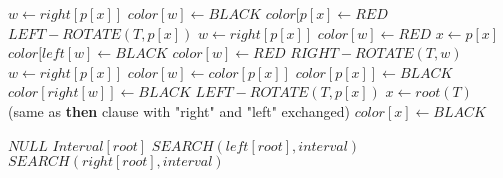\documentclass[11pt]{article}
\begin{document}
\addtocounter{algorithm}{-1}
\begin{algorithm}[h]
\begin{algorithmic}[1]
\EndProcedure
{}
\State $w \gets right[p[x]]$
\State $color[w] \gets BLACK$
\State $color[p[x] \gets RED$
\State $LEFT-ROTATE(T,p[x])$
\State $w \gets right[p[x]]$
\EndIf
{}
\State $color[w] \gets RED$
\State $ x \gets p[x]$
\State $color[left[w] \gets BLACK$
\State $color[w] \gets RED$
\State $ RIGHT-ROTATE(T,w)$
\State $w \gets right[p[x]]$
\Else
\State $color[w] \gets color[p[x]]$
\State $color[p[x]] \gets BLACK$
\State $color[right[w]] \gets BLACK$
\State $LEFT-ROTATE(T,p[x])$
\State $x \gets root(T)$
\EndIf
\Else
\State (same as \textbf{then} clause with "right" and "left" exchanged)
\EndIf
\EndWhile
\State $color[x] \gets BLACK$
\EndProcedure
\\
\end{algorithmic}
\end{algorithm}
\addtocounter{algorithm}{-1}
\begin{algorithm}[h]
\begin{algorithmic}[1]
 
\Return $NULL$
\EndIf
{} 
\Return $Interval[root]$
\EndIf
{}
\Return $SEARCH(left[root],interval)$
\EndIf
\Return $SEARCH(right[root],interval)$ 
\EndProcedure
\end{algorithmic}
\end{algorithm}
\end{document}
